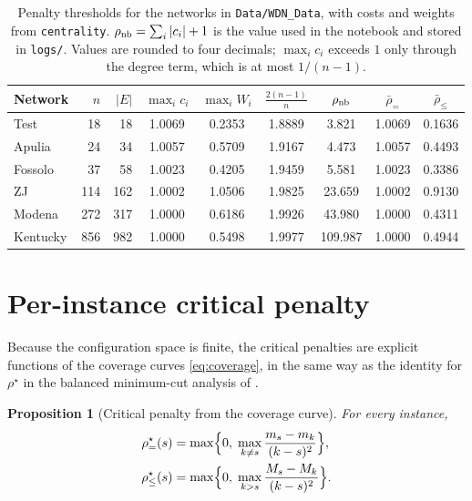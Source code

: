 \documentclass[11pt]{article}
\newtheorem{proposition}[theorem]{Proposition}
\newcommand{\rbeq}{\bar\rho_{=}}
\newcommand{\rble}{\bar\rho_{\le}}
\newcommand{\rseq}{\rho^\star_{=}}
\newcommand{\rsle}{\rho^\star_{\le}}
\begin{document}
\begin{table}[h]
\centering
\begin{tabular}{lrrcccccc}
\toprule
Network & $n$ & $|E|$ & $\max_ic_i$ & $\max_iW_i$ & $\frac{2(n-1)}{n}$ & $\rho_{\rm nb}$ & $\rbeq$ & $\rble$\\
\midrule
Test     & 18  & 18  & 1.0069 & 0.2353 & 1.8889 & 3.821   & 1.0069 & 0.1636\\
Apulia   & 24  & 34  & 1.0057 & 0.5709 & 1.9167 & 4.473   & 1.0057 & 0.4493\\
Fossolo  & 37  & 58  & 1.0023 & 0.4205 & 1.9459 & 5.581   & 1.0023 & 0.3386\\
ZJ       & 114 & 162 & 1.0002 & 1.0506 & 1.9825 & 23.659  & 1.0002 & 0.9130\\
Modena   & 272 & 317 & 1.0000 & 0.6186 & 1.9926 & 43.980  & 1.0000 & 0.4311\\
Kentucky & 856 & 982 & 1.0000 & 0.5498 & 1.9977 & 109.987 & 1.0000 & 0.4944\\
\bottomrule
\end{tabular}
\caption{Penalty thresholds for the networks in \texttt{Data/WDN\_Data}, with costs
and weights from \texttt{centrality}. $\rho_{\rm nb}=\sum_i|c_i|+1$ is the value
used in the notebook and stored in \texttt{logs/}. Values are rounded to four
decimals; $\max_ic_i$ exceeds $1$ only through the degree term, which is at most
$1/(n-1)$.}
\label{tab:networks}
\end{table}

\section{Per-instance critical penalty}
\label{sec:rhostar}

Because the configuration space is finite, the critical penalties are explicit
functions of the coverage curves \eqref{eq:coverage}, in the same way as the
identity for $\rho^\star$ in the balanced minimum-cut analysis of
\cite{RSDB2026}.

\begin{proposition}[Critical penalty from the coverage curve]
\label{prop:rhostar}
For every instance,
\begin{align}
\rseq(s)&=\max\Bigl\{0,\;\max_{k\neq s}\frac{m_s-m_k}{(k-s)^2}\Bigr\},
\label{eq:rhostar-eq}\\
\rsle(s)&=\max\Bigl\{0,\;\max_{k>s}\frac{M_s-M_k}{(k-s)^2}\Bigr\}.
\label{eq:rhostar-le}
\end{align}
\end{proposition}
\end{document}
